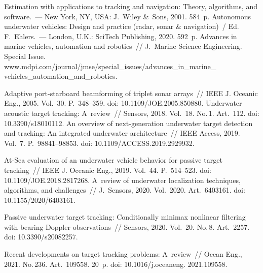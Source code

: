 \begin{multicols}{2}
   \vspace*{-6pt}
     
{\small\frenchspacing
 { %
 \begin{thebibliography}{99}
 Estimation with applications to tracking and 
navigation: Theory, algorithms, and software.~--- New York, NY, USA: J.~Wiley \&~Sons, 
2001. 584~p.
Autonomous underwater vehicles: Design and practice (radar, sonar \& navigation)~/ Ed. 
F.~Ehlers.~--- London, U.K.: SciTech Publishing, 2020. 592~p.
Advances in marine vehicles, automation and robotics~//  J.~Marine 
Science Engineering. Special Issue. {\sf 
www.mdpi.\linebreak com/journal/jmse/special\_issues/advances\_in\_marine\_ vehicles\_automation\_and\_robotics}.

       Adaptive port-starboard 
beamforming of triplet sonar arrays~// IEEE J. Oceanic Eng., 2005. Vol.~30. P.~348--359. doi: 
10.1109/JOE.2005.850880.
 Underwater acoustic target tracking: A~review~// Sensors, 2018. 
Vol.~18. No.\,1. Art.~112. doi: 10.3390/s18010112.
       An overview of next-generation underwater target detection 
and tracking: An integrated underwater architecture~// IEEE Access, 2019. Vol.~7.  
P.~98841--98853. doi: 10.1109/ACCESS.2019.2929932.

       At-Sea evaluation of an 
underwater vehicle behavior for passive target tracking~// IEEE J. Oceanic Eng., 2019. Vol.~44. 
P.~514--523. doi: 10.1109/JOE.2018.2817268.
 A~review of underwater localization techniques, 
algorithms, and challenges~// J.~Sensors, 2020. Vol.~2020. Art.~6403161. doi: 
10.1155/2020/6403161.



 Passive underwater target tracking: 
Conditionally minimax nonlinear filtering with bearing-Doppler observations~// Sensors, 2020. 
Vol.~20. No.\,8. Art.~2257. doi: 10.3390/s20082257.

 Recent developments on target tracking problems: A~review~// 
Ocean Eng., 2021. No.\,236. Art.~109558. 20~p. doi: 10.1016/j.oceaneng. 2021.109558.


\end{thebibliography}}}
\end{multicols}
